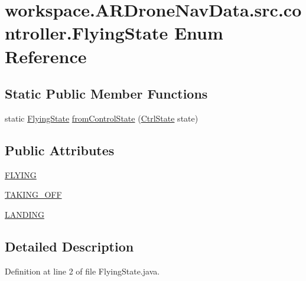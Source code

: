 \hypertarget{enumworkspace_1_1_a_r_drone_nav_data_1_1src_1_1controller_1_1_flying_state}{}\section{workspace.\+A\+R\+Drone\+Nav\+Data.\+src.\+controller.\+Flying\+State Enum Reference}
\label{enumworkspace_1_1_a_r_drone_nav_data_1_1src_1_1controller_1_1_flying_state}
\subsection*{Static Public Member Functions}
\begin{DoxyCompactItemize}
\item 
static \hyperlink{enumworkspace_1_1_a_r_drone_nav_data_1_1src_1_1controller_1_1_flying_state}{Flying\+State} \hyperlink{enumworkspace_1_1_a_r_drone_nav_data_1_1src_1_1controller_1_1_flying_state_a7508078580e7a54beb62d89c26be4574}{from\+Control\+State} (\hyperlink{enumworkspace_1_1_a_r_drone_nav_data_1_1src_1_1controller_1_1_ctrl_state}{Ctrl\+State} state)
\end{DoxyCompactItemize}
\subsection*{Public Attributes}
\begin{DoxyCompactItemize}
\item 
\hyperlink{enumworkspace_1_1_a_r_drone_nav_data_1_1src_1_1controller_1_1_flying_state_a632708e0a5fa83efb2d5099db7b8f385}{F\+L\+Y\+I\+N\+G}
\item 
\hyperlink{enumworkspace_1_1_a_r_drone_nav_data_1_1src_1_1controller_1_1_flying_state_aab59e058b45f5a8dbd0182e43781a159}{T\+A\+K\+I\+N\+G\+\_\+\+O\+F\+F}
\item 
\hyperlink{enumworkspace_1_1_a_r_drone_nav_data_1_1src_1_1controller_1_1_flying_state_ad17ba4a18698cd841657165c7252c2aa}{L\+A\+N\+D\+I\+N\+G}
\end{DoxyCompactItemize}


\subsection{Detailed Description}


Definition at line 2 of file Flying\+State.\+java.



